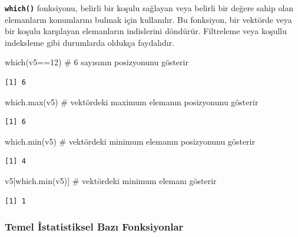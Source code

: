 \documentclass[
  letterpaper,
  DIV=11,
  numbers=noendperiod]{scrreprt}
\newenvironment{Shaded}{\begin{snugshade}}{\end{snugshade}}
\newcommand{\CommentTok}[1]{\textcolor[rgb]{0.37,0.37,0.37}{#1}}
\newcommand{\DecValTok}[1]{\textcolor[rgb]{0.68,0.00,0.00}{#1}}
\newcommand{\FunctionTok}[1]{\textcolor[rgb]{0.28,0.35,0.67}{#1}}
\newcommand{\NormalTok}[1]{\textcolor[rgb]{0.00,0.23,0.31}{#1}}
\newcommand{\SpecialCharTok}[1]{\textcolor[rgb]{0.37,0.37,0.37}{#1}}
\begin{document}
\textbf{\texttt{which()}} fonksiyonu, belirli bir koşulu sağlayan veya
belirli bir değere sahip olan elemanların konumlarını bulmak için
kullanılır. Bu fonksiyon, bir vektörde veya bir koşulu karşılayan
elemanların indislerini döndürür. Filtreleme veya koşullu indeksleme
gibi durumlarda oldukça faydalıdır.

\begin{Shaded}
\begin{Highlighting}[]
\FunctionTok{which}\NormalTok{(v5}\SpecialCharTok{==}\DecValTok{12}\NormalTok{) }\CommentTok{\# 6 sayısının posizyonunu gösterir}
\end{Highlighting}
\end{Shaded}

\begin{verbatim}
[1] 6
\end{verbatim}

\begin{Shaded}
\begin{Highlighting}[]
\FunctionTok{which.max}\NormalTok{(v5) }\CommentTok{\# vektördeki maximum elemanın posizyonunu gösterir}
\end{Highlighting}
\end{Shaded}

\begin{verbatim}
[1] 6
\end{verbatim}

\begin{Shaded}
\begin{Highlighting}[]
\FunctionTok{which.min}\NormalTok{(v5) }\CommentTok{\# vektördeki minimum elemanın posizyonunu gösterir}
\end{Highlighting}
\end{Shaded}

\begin{verbatim}
[1] 4
\end{verbatim}

\begin{Shaded}
\begin{Highlighting}[]
\NormalTok{v5[}\FunctionTok{which.min}\NormalTok{(v5)] }\CommentTok{\# vektördeki minimum elemanı gösterir}
\end{Highlighting}
\end{Shaded}

\begin{verbatim}
[1] 1
\end{verbatim}

\hypertarget{temel-istatistiksel-bazux131-fonksiyonlar}{%
\subsubsection{Temel İstatistiksel Bazı
Fonksiyonlar}\label{temel-istatistiksel-bazux131-fonksiyonlar}}
\end{document}

